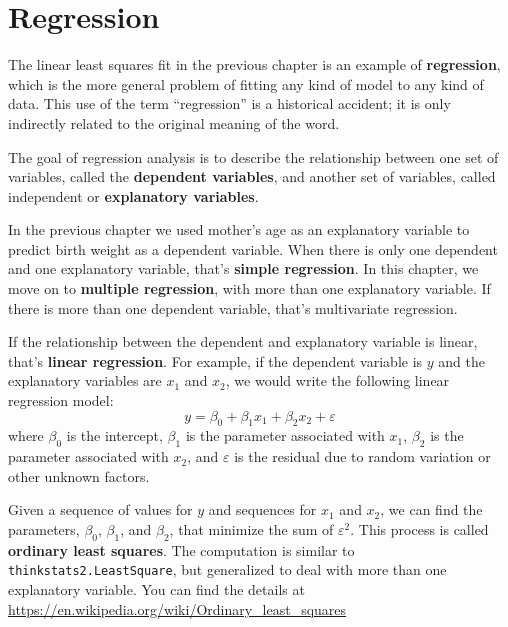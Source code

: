 \documentclass[12pt]{book}
\newcommand{\eps}{\varepsilon}
\theoremstyle{exercise}
\begin{document}
\chapter{Regression}%
\label{regression}

The linear least squares fit in the previous chapter is an example of
{\bf regression}, which is the more general problem of fitting any
kind of model to any kind of data.  This use of the term ``regression''
is a historical accident; it is only indirectly related to the
original meaning of the word.%
%

The goal of regression analysis is to describe the relationship
between one set of variables, called the {\bf dependent variables},
and another set of variables, called independent or {\bf
  explanatory variables}.%
%

In the previous chapter we used mother's age as an explanatory
variable to predict birth weight as a dependent variable.  When there
is only one dependent and one explanatory variable, that's {\bf
  simple regression}.  In this chapter, we move on to {\bf multiple
  regression}, with more than one explanatory variable.  If there is
more than one dependent variable, that's multivariate
regression.%
%
%
%

If the relationship between the dependent and explanatory variable
is linear, that's {\bf linear regression}.  For example,
if the dependent variable is $y$ and the explanatory variables
are $x_1$ and $x_2$, we would write the following linear
regression model:
%
\[ y = \beta_0 + \beta_1 x_1 + \beta_2 x_2 + \eps \]
%
where $\beta_0$ is the intercept, $\beta_1$ is the parameter
associated with $x_1$, $\beta_2$ is the parameter associated with
$x_2$, and $\eps$ is the residual due to random variation or other
unknown factors.%
%

Given a sequence of values for $y$ and sequences for $x_1$ and $x_2$,
we can find the parameters, $\beta_0$, $\beta_1$, and $\beta_2$, that
minimize the sum of $\eps^2$.  This process is called
{\bf ordinary least squares}.  The computation is similar to {\tt
  thinkstats2.LeastSquare}, but generalized to deal with more than one
explanatory variable.  You can find the details at
\url{https://en.wikipedia.org/wiki/Ordinary_least_squares}%
%
%
\end{document}
